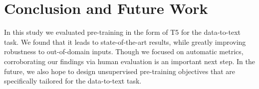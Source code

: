 \documentclass[11pt,a4paper]{article}
\begin{document}
\section{Conclusion and Future Work}
In this study we evaluated pre-training in the form of T5 for the data-to-text task. We found that it leads to state-of-the-art results, while greatly improving robustness to out-of-domain inputs. Though we focused on automatic metrics, corroborating our findings via human evaluation is an important next step. In the future, we also hope to design unsupervised pre-training objectives that are specifically tailored for the data-to-text task. 




\end{document}
